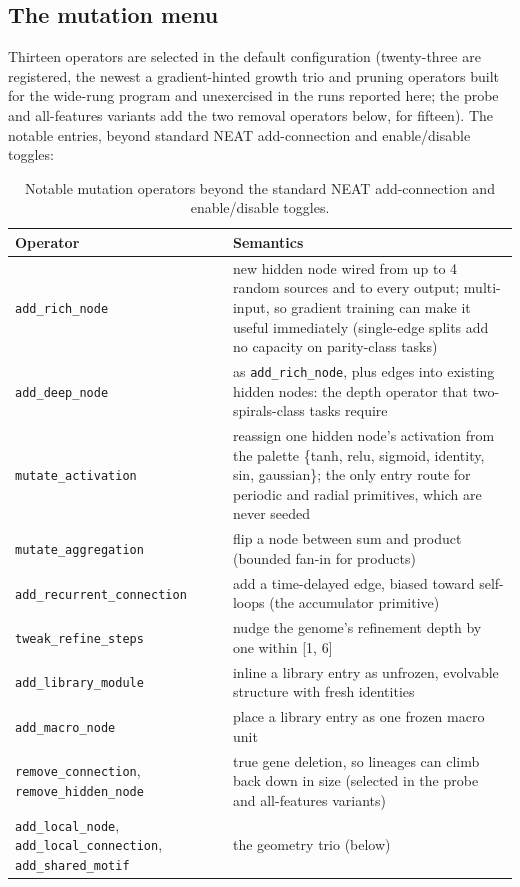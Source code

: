 \documentclass[11pt]{article}
\begin{document}
\subsection{The mutation menu}

Thirteen operators are selected in the default configuration (twenty-three are registered, the newest a gradient-hinted growth trio and pruning operators built for the wide-rung program and unexercised in the runs reported here; the probe and all-features variants add the two removal operators below, for fifteen). The notable entries, beyond standard NEAT add-connection and enable/disable toggles:

\begin{table}[htbp]
\centering
\small
\caption{Notable mutation operators beyond the standard NEAT add-connection and enable/disable toggles.}
\label{tab:mutation}
\begin{tabularx}{\textwidth}{@{}l L@{}}
\toprule
Operator & Semantics \\
\midrule
\texttt{add_rich_node} & new hidden node wired from up to 4 random sources and to every output; multi-input, so gradient training can make it useful immediately (single-edge splits add no capacity on parity-class tasks) \\
\texttt{add_deep_node} & as \texttt{add_rich_node}, plus edges into existing hidden nodes: the depth operator that two-spirals-class tasks require \\
\texttt{mutate_activation} & reassign one hidden node's activation from the palette \{tanh, relu, sigmoid, identity, sin, gaussian\}; the only entry route for periodic and radial primitives, which are never seeded \\
\texttt{mutate_aggregation} & flip a node between sum and product (bounded fan-in for products) \\
\texttt{add_recurrent_connection} & add a time-delayed edge, biased toward self-loops (the accumulator primitive) \\
\texttt{tweak_refine_steps} & nudge the genome's refinement depth by one within [1, 6] \\
\texttt{add_library_module} & inline a library entry as unfrozen, evolvable structure with fresh identities \\
\texttt{add_macro_node} & place a library entry as one frozen macro unit \\
\texttt{remove_connection}, \texttt{remove_hidden_node} & true gene deletion, so lineages can climb back down in size (selected in the probe and all-features variants) \\
\texttt{add_local_node}, \texttt{add_local_connection}, \texttt{add_shared_motif} & the geometry trio (below) \\
\bottomrule
\end{tabularx}
\end{table}
\end{document}
